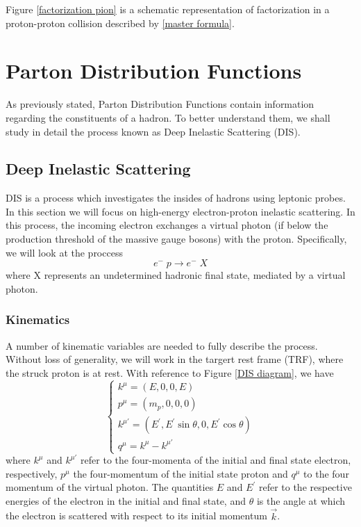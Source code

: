 \documentclass[10pt,a4paper]{book}
\begin{document}
Figure \ref{factorization pion} is a schematic representation of factorization in a proton-proton collision described by \ref{master formula}.

\section{Parton Distribution Functions}

As previously stated, Parton Distribution Functions contain information regarding the constituents of a hadron. To better understand them, we shall study in detail the process known as Deep Inelastic Scattering (DIS).

\subsection{Deep Inelastic Scattering}

DIS is a process which investigates the insides of hadrons using leptonic probes. In this section we will focus on high-energy electron-proton inelastic scattering. In this process, the incoming electron exchanges a virtual photon (if below the production threshold of the massive gauge bosons) with the proton. Specifically, we will look at the proccess
\begin{equation}
e^- \; p \rightarrow e^- \; X
\end{equation}
where X represents an undetermined hadronic final state, mediated by a virtual photon. 

\subsubsection{Kinematics} 
A number of kinematic variables are needed to fully describe the process. Without loss of generality, we will work in the targert rest frame (TRF), where the struck proton is at rest. With reference to Figure \ref{DIS diagram}, we have
\begin{equation}
\begin{cases}
k^\mu = (E, 0, 0, E)  \\
p^\mu = (m_p, 0, 0, 0) \\
k^{\mu\prime} = (E^\prime, E^\prime \sin\theta, 0, E^\prime \cos\theta) \\
q^\mu = k^\mu - k^{\mu\prime}
\end{cases}
\label{kinematics}
\end{equation}
where $k^\mu$ and $k^{\mu\prime}$ refer to the four-momenta of the initial and final state electron, respectively, $p^\mu$ the four-momentum of the initial state proton and $q^\mu$ to the four momentum of the virtual photon. The quantities $E$ and $E^\prime$ refer to the respective energies of the electron in the initial and final state, and $\theta$ is the angle at which the electron is scattered with respect to its initial momentum $\vec{k}$. 
\end{document}
